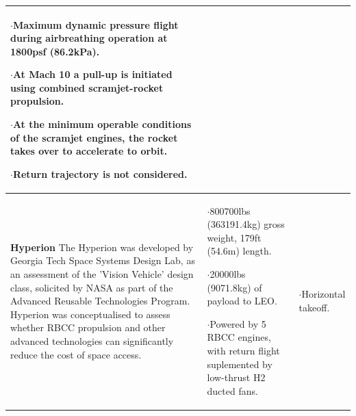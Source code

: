 {\begin{landscape}
\begin{xltabular}{\linewidth}{|X|X|X|}
$\cdot$Maximum dynamic pressure flight during airbreathing operation at 1800psf (86.2kPa).

$\cdot$At Mach 10 a pull-up is initiated using combined scramjet-rocket propulsion. 

$\cdot$At the minimum operable conditions of the scramjet engines, the rocket takes over to accelerate to orbit. 

$\cdot$Return trajectory is not considered. \\

\hline \small\textbf{Hyperion}\cite{Hyperion}\newline \newline 
The Hyperion was developed by Georgia Tech Space Systems Design Lab, as an assessment of the 'Vision Vehicle' design class, solicited by NASA as part of the Advanced Reusable Technologies Program. Hyperion was conceptualised to assess whether RBCC propulsion and other advanced technologies can significantly reduce the cost of space access. 
&\small {}  

$\cdot$800700lbs (363191.4kg) gross weight, 179ft (54.6m) length. 

$\cdot$20000lbs (9071.8kg) of payload to LEO. 

$\cdot$Powered by 5 RBCC engines, with return flight suplemented by low-thrust H2 ducted fans. 

&\small {} 

$\cdot$Horizontal takeoff.


\end{xltabular}
\end{landscape}}
